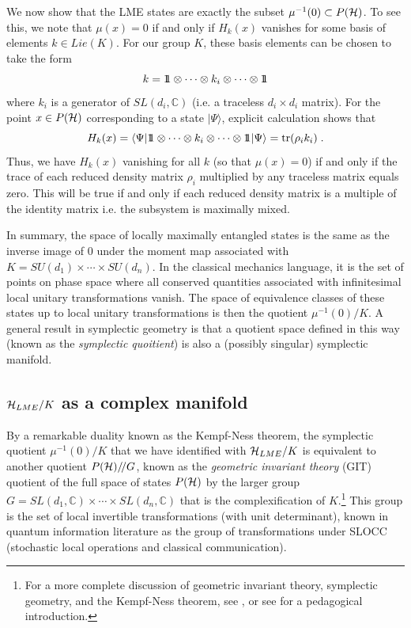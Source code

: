 \documentclass[12pt]{article}
\theoremstyle{definition}
\newcommand{\be}{\begin{equation}}
\newcommand{\ee}{\end{equation}}
\def\identity{{\rlap{1} \hskip 1.6pt \hbox{1}}}
\newcommand{\tr}{{\rm tr}}
\newcommand{\GITquot}{/\!/}
\begin{document}
We now show that the LME states are exactly the subset $\mu^{-1}(0) \subset P({\cal H})$. To see this, we note that $\mu(x) = 0$ if and only if $H_k(x)$ vanishes for some basis of elements $k \in Lie(K)$. For our group $K$, these basis elements can be chosen to take the form
\be
k = \identity  \otimes \cdots \otimes k_i \otimes \cdots  \otimes \identity
\ee
where $k_i$ is a generator of $SL(d_i,\mathbb{C})$ (i.e. a traceless $d_i \times d_i$ matrix). For the point $x \in P({\cal H})$ corresponding to a state $|\Psi \rangle$, explicit calculation shows that
\be
H_k(x) = \langle \Psi| \identity  \otimes \cdots \otimes k_i \otimes \cdots  \otimes \identity | \Psi \rangle = \tr (\rho_i k_i) \; .
\ee
Thus, we have $H_k(x)$ vanishing for all $k$ (so that $\mu(x)=0$) if and only if the trace of each reduced density matrix $\rho_i$ multiplied by any traceless matrix equals zero. This will be true if and only if each reduced density matrix is a multiple of the identity matrix i.e. the subsystem is maximally mixed.

In summary, the space of locally maximally entangled states is the same as the inverse image of $0$ under the moment map associated with $K = SU(d_1) \times \cdots \times SU(d_n)$. In the classical mechanics language, it is the set of points on phase space where all conserved quantities associated with infinitesimal local unitary transformations vanish. The space of equivalence classes of these states up to local unitary transformations is then the quotient $\mu^{-1}(0)/K$. A general result in symplectic geometry is that a quotient space defined in this way (known as the {\it symplectic quoitient}) is also a (possibly singular) symplectic manifold.

\subsection{${\cal H}_{LME}/K$ as a complex manifold}

By a remarkable duality known as the Kempf-Ness theorem, the
symplectic quotient $\mu^{-1}(0)/K$ that we have identified with
${\cal H}_{LME}/K$ is equivalent to another quotient $P({\cal H})\GITquot G$,
known as the {\it geometric invariant theory} (GIT)
quotient of the full space of states $P({\cal H})$ by the larger group
$G = SL(d_1, \mathbb{C}) \times \cdots \times SL(d_n, \mathbb{C})$
that is the complexification of $K$.\footnote{For a more complete discussion of geometric
invariant theory, symplectic geometry, and the Kempf-Ness theorem, see
\cite{mfk}, or see \cite{Hoskins} for a pedagogical introduction.} This group is the set of local
invertible transformations (with unit determinant), known in quantum
information literature as the group of transformations under SLOCC
(stochastic local operations and classical communication).
\end{document}
